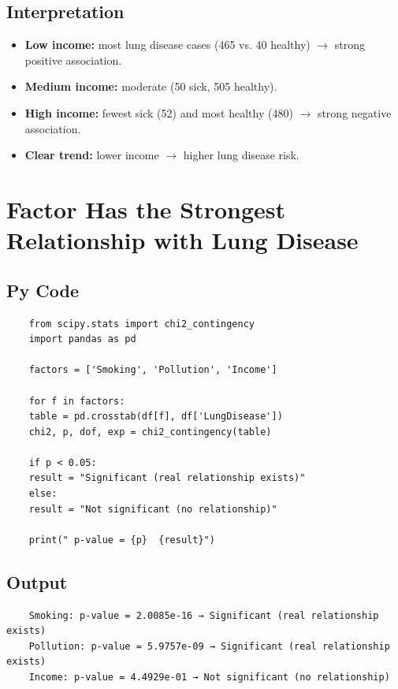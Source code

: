 \documentclass[a4paper,12pt]{article}
\begin{document}
\vspace{1em} %
\subsection{Interpretation}
\begin{itemize}
	\item \textbf{Low income:} most lung disease cases (465 vs. 40 healthy) $\rightarrow$ strong positive association.
	\item \textbf{Medium income:} moderate (50 sick, 505 healthy).
	\item \textbf{High income:} fewest sick (52) and most healthy (480) $\rightarrow$ strong negative association.
	\item \textbf{Clear trend:} lower income $\rightarrow$ higher lung disease risk.
\end{itemize}
\section{Factor Has the Strongest Relationship with Lung Disease}

\subsection{Py Code}
\begin{lstlisting}
	from scipy.stats import chi2_contingency
	import pandas as pd
	
	factors = ['Smoking', 'Pollution', 'Income']
	
	for f in factors:
	table = pd.crosstab(df[f], df['LungDisease'])
	chi2, p, dof, exp = chi2_contingency(table)
	
	if p < 0.05:
	result = "Significant (real relationship exists)"
	else:
	result = "Not significant (no relationship)"
	
	print(" p-value = {p}  {result}")
\end{lstlisting}

\subsection{Output}
\begin{verbatim}
	Smoking: p-value = 2.0085e-16 → Significant (real relationship exists)
	Pollution: p-value = 5.9757e-09 → Significant (real relationship exists) 
	Income: p-value = 4.4929e-01 → Not significant (no relationship) 
\end{verbatim}
\end{document}
